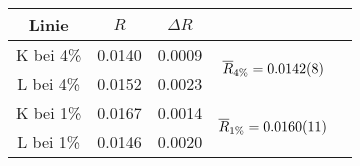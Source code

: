 \begin{tabular}{cSSSl}
\toprule
Linie  & {$R$}      & ${\Delta R}$     & \\
\midrule
K bei 4\% & 0.0140 & 0.0009 &  \\
L bei 4\% & 0.0152 & 0.0023 &                    \\
K bei 1\% & 0.0167 & 0.0014 &  \\
L bei 1\% & 0.0146 & 0.0020 &                    \\
\bottomrule
\end{tabular}